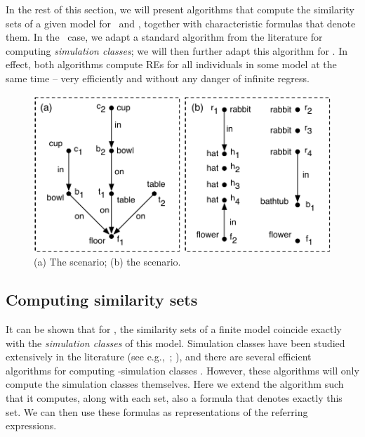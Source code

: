 In the rest of this section, we will present algorithms that compute
the similarity sets of a given model for \alc\ and \el, together with
characteristic formulas that denote them.  In the \alc\ case, we adapt
a standard algorithm from the literature for computing
\emph{simulation classes}; we will then further adapt this algorithm
for \el.  In effect, both algorithms compute REs for all individuals
in some model at the same time -- very efficiently and without any
danger of infinite regress.


\begin{figure}[t]
  \centering
  \includegraphics[width=\columnwidth]{pic-dale-haddock}
  \caption{(a) The 
    scenario; (b) the  scenario.}
  \label{fig:dale-haddock}\vspace*{-1ex}
\end{figure}


\subsection{Computing similarity sets}

It can be shown that for \alc, the similarity sets of a finite model
coincide exactly with the \emph{simulation classes} of this model.
Simulation classes have been studied extensively in the literature
(see e.g.,~; ), and there are several
efficient algorithms for computing \alc-simulation classes
\cite{hopc:algo71,paig:thre87,dovier04:_effic_algor_for_comput_bisim_equiv}.
However, these algorithms will only compute the simulation classes
themselves. Here we extend the  algorithm such
that it computes, along with each set, also a formula that denotes
exactly this set.  We can then use these formulas as representations
of the referring expressions.

